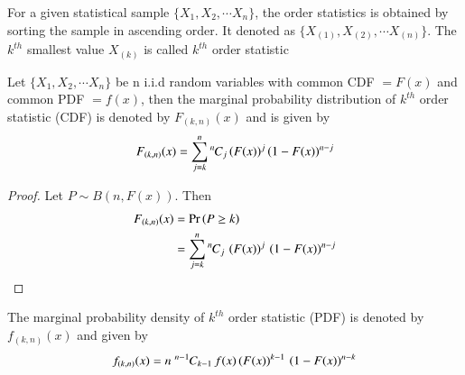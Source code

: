 \begin{definition}
    For a given statistical sample $\{X_1, X_2,\cdots X_n\}$, the order statistics is obtained by sorting the
    sample in ascending order. It denoted as $\{X_{(1)}, X_{(2)},\cdots X_{(n)}\}$. The $k^{th}$ smallest value
    $X_{(k)}$ is called  $k^{th}$ order statistic 
    \end{definition}
    \begin{theorem}
    Let $\{X_1, X_2, \cdots X_n\}$ be n i.i.d random variables with common CDF $= F(x)$ and common PDF $= f(x)$, 
    then the marginal probability distribution of $k^{th}$ order statistic (CDF) is denoted by $F_{(k,n)}(x)$ 
    and is given by
    \begin{align}
    F_{(k,n)}(x) =  \sum_{j=k}^{n}{{}^{n}\mkern-1muC_{j}} \left(F(x)\right)^{j}\left(1-F(x)\right)^{n-j} \label{stats/5/eqn_1}
    \end{align}
    \label{stats/5/th1}
    \end{theorem}
    \begin{proof}
        Let $P \sim B(n,F(x))$.  Then
        \begin{align}
         F_{(k,n)}(x) &= \Pr\left(P\geq k\right) \\
         &=  \sum_{j=k}^{n}{{}^{n}\mkern-1muC_{j}}\, \left(F(x)\right)^{j}\,\left(1-F(x)\right)^{n-j} 
        \end{align}
        \end{proof}
    \begin{corollary}
    The marginal probability density of $k^{th}$ order statistic (PDF) is denoted by $f_{(k,n)}(x)$  and 
     given by
    \begin{align}
    f_{(k,n)}(x) = n\;{{}^{n-1}\mkern-1muC_{k-1}}\,f(x)\,(F(x))^{k-1}\,\left(1-F(x)\right)^{n-k} \label{stats/5/eqn_2}
    \end{align}
    \label{stats/5/th2}
    \end{corollary}
